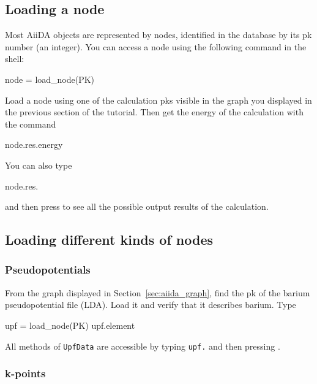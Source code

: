 
\subsection[load_node]{Loading a node\label{load_node}}

Most AiiDA objects are represented by nodes, identified in the database by its pk number (an integer). 
You can access a node using the following command in the shell:
\begin{pythoncommand}
 node = load_node(PK)
\end{pythoncommand}
Load a node using one of the calculation pks visible in the graph you displayed
in the previous section of the tutorial. Then get the energy of the
calculation with the command
\begin{pythoncommand}
 node.res.energy
\end{pythoncommand}
You can also type
\begin{pythoncommand}
 node.res.
\end{pythoncommand}
and then press  to see all the possible output
results of the calculation.


\subsection{Loading different kinds of nodes}

\subsubsection{Pseudopotentials}

From the graph displayed in Section~\ref{sec:aiida_graph}, find the pk of the barium pseudopotential file (LDA). Load it and verify that it describes barium. Type
\begin{pythoncommand}
 upf = load_node(PK)
 upf.element
\end{pythoncommand}
All methods of \texttt{UpfData} are accessible by typing \texttt{upf.} and then pressing .

\subsubsection{k-points}

